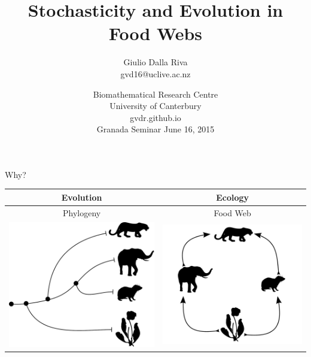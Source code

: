 \documentclass[]{beamer}
\title{Stochasticity and Evolution in Food Webs}
\author{Giulio Dalla Riva\\
\tiny{gvd16@uclive.ac.nz}\\
}
\date{  {\tiny Biomathematical Research Centre\\
  University of Canterbury\\
     gvdr.github.io\\
     \vskip 0.5cm
  }
Granada Seminar June 16, 2015}
\begin{document}
\frame{\titlepage
\addtocounter{framenumber}{-1}}

\begin{frame}{Why?}

\centering
\begin{tabular}{|c|c|}\hline
Evolution & Ecology \\\hline\hline
Phylogeny & Food Web \\
\includegraphics[width=0.4 \textwidth]{images/small_phylo.pdf} & \includegraphics[width=0.4 \textwidth]{images/small_fw.pdf} \\ \hline
\end{tabular}

\end{frame}
\end{document}
